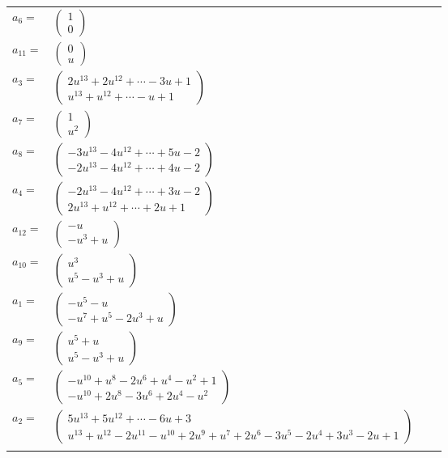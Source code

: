 \documentclass[1p]{elsarticle_modified}
\theoremstyle{definition}
\begin{document}
\begin{tabular}{m{7pt} m{180pt} m{7pt} m{180pt} }
\flushright $a_{6}=$&$\begin{pmatrix}1\\0\end{pmatrix}$ \\
\flushright $a_{11}=$&$\begin{pmatrix}0\\u\end{pmatrix}$ \\
\flushright $a_{3}=$&$\begin{pmatrix}2 u^{13}+2 u^{12}+\cdots-3 u+1\\u^{13}+u^{12}+\cdots- u+1\end{pmatrix}$ \\
\flushright $a_{7}=$&$\begin{pmatrix}1\\u^2\end{pmatrix}$ \\
\flushright $a_{8}=$&$\begin{pmatrix}-3 u^{13}-4 u^{12}+\cdots+5 u-2\\-2 u^{13}-4 u^{12}+\cdots+4 u-2\end{pmatrix}$ \\
\flushright $a_{4}=$&$\begin{pmatrix}-2 u^{13}-4 u^{12}+\cdots+3 u-2\\2 u^{13}+u^{12}+\cdots+2 u+1\end{pmatrix}$ \\
\flushright $a_{12}=$&$\begin{pmatrix}- u\\- u^3+u\end{pmatrix}$ \\
\flushright $a_{10}=$&$\begin{pmatrix}u^3\\u^5- u^3+u\end{pmatrix}$ \\
\flushright $a_{1}=$&$\begin{pmatrix}- u^5- u\\- u^7+u^5-2 u^3+u\end{pmatrix}$ \\
\flushright $a_{9}=$&$\begin{pmatrix}u^5+u\\u^5- u^3+u\end{pmatrix}$ \\
\flushright $a_{5}=$&$\begin{pmatrix}- u^{10}+u^8-2 u^6+u^4- u^2+1\\- u^{10}+2 u^8-3 u^6+2 u^4- u^2\end{pmatrix}$ \\
\flushright $a_{2}=$&$\begin{pmatrix}5 u^{13}+5 u^{12}+\cdots-6 u+3\\u^{13}+u^{12}-2 u^{11}- u^{10}+2 u^9+u^7+2 u^6-3 u^5-2 u^4+3 u^3-2 u+1\end{pmatrix}$\\&\end{tabular}
\end{document}
